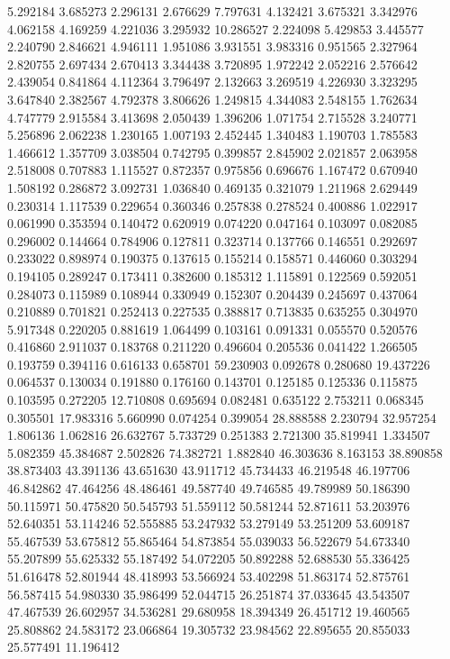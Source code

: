 5.292184
3.685273
2.296131
2.676629
7.797631
4.132421
3.675321
3.342976
4.062158
4.169259
4.221036
3.295932
10.286527
2.224098
5.429853
3.445577
2.240790
2.846621
4.946111
1.951086
3.931551
3.983316
0.951565
2.327964
2.820755
2.697434
2.670413
3.344438
3.720895
1.972242
2.052216
2.576642
2.439054
0.841864
4.112364
3.796497
2.132663
3.269519
4.226930
3.323295
3.647840
2.382567
4.792378
3.806626
1.249815
4.344083
2.548155
1.762634
4.747779
2.915584
3.413698
2.050439
1.396206
1.071754
2.715528
3.240771
5.256896
2.062238
1.230165
1.007193
2.452445
1.340483
1.190703
1.785583
1.466612
1.357709
3.038504
0.742795
0.399857
2.845902
2.021857
2.063958
2.518008
0.707883
1.115527
0.872357
0.975856
0.696676
1.167472
0.670940
1.508192
0.286872
3.092731
1.036840
0.469135
0.321079
1.211968
2.629449
0.230314
1.117539
0.229654
0.360346
0.257838
0.278524
0.400886
1.022917
0.061990
0.353594
0.140472
0.620919
0.074220
0.047164
0.103097
0.082085
0.296002
0.144664
0.784906
0.127811
0.323714
0.137766
0.146551
0.292697
0.233022
0.898974
0.190375
0.137615
0.155214
0.158571
0.446060
0.303294
0.194105
0.289247
0.173411
0.382600
0.185312
1.115891
0.122569
0.592051
0.284073
0.115989
0.108944
0.330949
0.152307
0.204439
0.245697
0.437064
0.210889
0.701821
0.252413
0.227535
0.388817
0.713835
0.635255
0.304970
5.917348
0.220205
0.881619
1.064499
0.103161
0.091331
0.055570
0.520576
0.416860
2.911037
0.183768
0.211220
0.496604
0.205536
0.041422
1.266505
0.193759
0.394116
0.616133
0.658701
59.230903
0.092678
0.280680
19.437226
0.064537
0.130034
0.191880
0.176160
0.143701
0.125185
0.125336
0.115875
0.103595
0.272205
12.710808
0.695694
0.082481
0.635122
2.753211
0.068345
0.305501
17.983316
5.660990
0.074254
0.399054
28.888588
2.230794
32.957254
1.806136
1.062816
26.632767
5.733729
0.251383
2.721300
35.819941
1.334507
5.082359
45.384687
2.502826
74.382721
1.882840
46.303636
8.163153
38.890858
38.873403
43.391136
43.651630
43.911712
45.734433
46.219548
46.197706
46.842862
47.464256
48.486461
49.587740
49.746585
49.789989
50.186390
50.115971
50.475820
50.545793
51.559112
50.581244
52.871611
53.203976
52.640351
53.114246
52.555885
53.247932
53.279149
53.251209
53.609187
55.467539
53.675812
55.865464
54.873854
55.039033
56.522679
54.673340
55.207899
55.625332
55.187492
54.072205
50.892288
52.688530
55.336425
51.616478
52.801944
48.418993
53.566924
53.402298
51.863174
52.875761
56.587415
54.980330
35.986499
52.044715
26.251874
37.033645
43.543507
47.467539
26.602957
34.536281
29.680958
18.394349
26.451712
19.460565
25.808862
24.583172
23.066864
19.305732
23.984562
22.895655
20.855033
25.577491
11.196412
